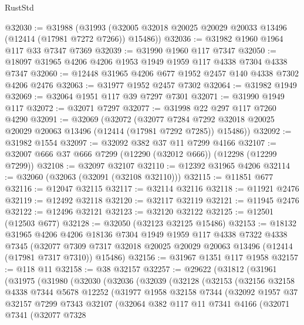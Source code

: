 \begin{lexlean}{RustStd}
\begin{coremodule}
@32030 := @31988
    (@31993 (@32005 @32018 @20025 @20029 @20033 @13496 (@12414 (@17981 @7272 @7266)) @15486))
@32036 := @31982 @1960 @1964 @117 @33 @7347 @7369
@32039 := @31990 @1960 @117 @7347
@32050 := @18097 @31965 @4206 @4206 @1953 @1949 @1959 @117 @4338 @7304 @4338 @7347
@32060 := @12448 @31965 @4206 @677 @1952 @2457 @140 @4338 @7302 @4206 @2476
@32063 := @31977 @1952 @2457 @7302
@32064 := @31982 @1949
@32069 := @32064 @1951 @117 @39 @7297 @7301
@32071 := @31990 @1949 @117
@32072 := @32071 @7297
@32077 := @31998 @22 @297 @117 @7260 @4290
@32091 := @32069
    (@32072
      (@32077 @7284 @7292 @32018 @20025 @20029 @20063 @13496 (@12414 (@17981 @7292 @7285)) @15486))
@32092 := @31982 @1554
@32097 := @32092 @382 @37 @11 @7299 @4166
@32107 := @32007 @666 @37 @666 @7299 (@12290 (@32012 @666)) (@12298 (@12299 @7299))
@32108 := @32097 @32107
@32110 := @12392 @31965 @4206
@32114 := @32060 (@32063 (@32091 (@32108 @32110)))
@32115 := @11851 @677
@32116 := @12047 @32115
@32117 := @32114 @32116
@32118 := @11921 @2476
@32119 := @12492 @32118
@32120 := @32117 @32119
@32121 := @11945 @2476
@32122 := @12496 @32121
@32123 := @32120 @32122
@32125 := @12501 (@12503 @677)
@32128 := @32050 (@32123 @32125 @15486)
@32153 := @18132
    @31965
    @4206
    @4206
    @18136
    @7304
    @1949
    @1959
    @117
    @4338
    @7322
    @4338
    @7345
    (@32077 @7309 @7317 @32018 @20025 @20029 @20063 @13496 (@12414 (@17981 @7317 @7310)) @15486)
@32156 := @31967 @1351 @117 @1958
@32157 := @118 @11
@32158 := @38 @32157
@32257 := @29622
    (@31812
      (@31961
        (@31975
          (@31980
            (@32030
              (@32036
                (@32039
                  (@32128
                    (@32153
                      (@32156
                        @32158
                        @4338
                        @7344
                        @5678
                        @12252
                        (@31977
                          @1958
                          @32158
                          @7344
                          (@32092
                            @1957
                            @37
                            @32157
                            @7299
                            @7343
                            @32107
                            (@32064
                              @382
                              @117
                              @11
                              @7341
                              @4166
                              (@32071
                                @7341
                                (@32077
                                  @7328

\end{coremodule}
\end{lexlean}
